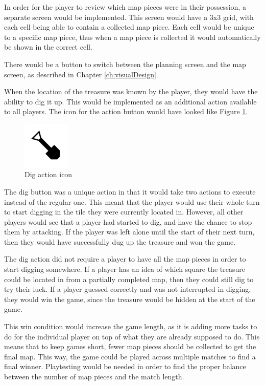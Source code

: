 In order for the player to review which map pieces were in their possession, a separate screen would be implemented. This screen would have a 3x3 grid, with each cell being able to contain a collected map piece. Each cell would be unique to a specific map piece, thus when a map piece is collected it would automatically be shown in the correct cell.

There would be a button to switch between the planning screen and the map screen, as described in Chapter \ref{ch:visualDesign}.

When the location of the treasure was known by the player, they would have the ability to dig it up. This would be implemented as an additional action available to all players. The icon for the action button would have looked like Figure \ref{fig:dig}.

\begin{figure}[h!]
	\centering
	\includegraphics[width=0.2\textwidth]{figures/dig.png}
	\caption{Dig action icon \label{fig:dig}}
\end{figure}

The dig button was a unique action in that it would take two actions to execute instead of the regular one. This meant that the player would use their whole turn to start digging in the tile they were currently located in. However, all other players would see that a player had started to dig, and have the chance to stop them by attacking. If the player was left alone until the start of their next turn, then they would have successfully dug up the treasure and won the game. 

The dig action did not require a player to have all the map pieces in order to start digging somewhere. If a player has an idea of which square the treasure could be located in from a partially completed map, then they could still dig to try their luck. If a player guessed correctly and was not interrupted in digging, they would win the game, since the treasure would be hidden at the start of the game.

This win condition would increase the game length, as it is adding more tasks to do for the individual player on top of what they are already supposed to do. This means that to keep games short, fewer map pieces should be collected to get the final map. This way, the game could be played across multiple matches to find a final winner. Playtesting would be needed in order to find the proper balance between the number of map pieces and the match length.

